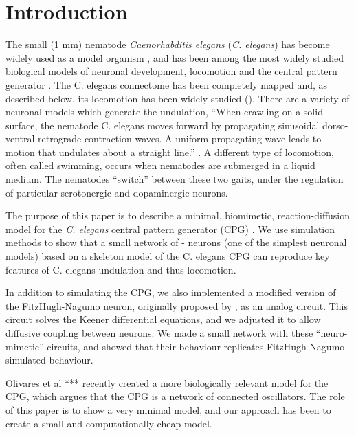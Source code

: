 \documentclass[
    11pt,
]{article}
\begin{document}
\section{Introduction}\label{sec: intro}


The small (1 mm) nematode \emph{Caenorhabditis elegans} (\emph{C. elegans}) has become widely used as a model organism \citep{corsi2015}, and has been among the most widely studied biological models of neuronal development, locomotion and the central pattern generator \citep{katz2016}.
The C. elegans connectome has been completely mapped \citep{jabr} and, as described below, its locomotion has been widely studied (\citet{corsi2015}).  There are a variety of neuronal models which generate the undulation,
``When crawling on a solid surface, the nematode C. elegans moves forward by propagating sinusoidal dorso-ventral retrograde contraction waves.  A uniform propagating wave leads to motion that undulates about a straight line.'' \citep{kim2011}.
A different type of locomotion, often called swimming, occurs when nematodes are submerged in a liquid medium. The nematodes “switch” between these two gaits, under the regulation of particular serotonergic and dopaminergic neurons.

The purpose of this paper is to describe a minimal, biomimetic, reaction-diffusion model for the \emph{C. elegans} central pattern generator (CPG) \citep{xu2018, wen2012}.  We use simulation methods to show that a small network of \citet{fitzhugh1955}-\citet{nagumo1962} neurons (one of the simplest neuronal models) based on a skeleton model of the C. elegans CPG can reproduce key features of C. elegans undulation \citep{magnes2012} and thus locomotion.

In addition to simulating the CPG, we also implemented a modified version of the FitzHugh-Nagumo neuron, originally proposed by \citet{keener1983}, as an analog circuit.  This circuit solves the Keener differential equations, and we adjusted it to allow diffusive coupling between neurons.  We made a small network with these ``neuro-mimetic'' circuits, and showed that their behaviour replicates FitzHugh-Nagumo simulated behaviour.


Olivares et al *** recently created a more biologically relevant model for the CPG, which argues that the CPG is a network of connected oscillators.  The role of this paper is to show a very minimal model, and our approach has been to create a small and computationally cheap model.
\end{document}
